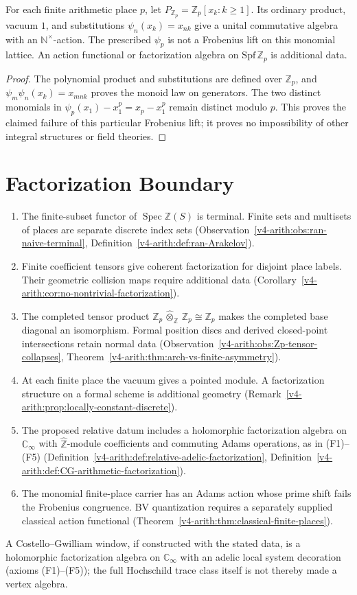 \begin{theorem}
\label{v4-arith:thm:classical-finite-places}
For each finite arithmetic place \(p\), let
\(P_{\mathbb Z_p}=\mathbb Z_p[x_k:k\ge1]\). Its ordinary product,
vacuum \(1\), and substitutions \(\psi_n(x_k)=x_{nk}\) give a unital
commutative algebra with an \(\mathbb N^{\times}\)-action.
The prescribed \(\psi_p\) is not a Frobenius lift on this monomial
lattice. An action functional or factorization algebra on
\(\mathrm{Spf}\,\mathbb Z_p\) is additional data.
\end{theorem}
\begin{proof}
The polynomial product and substitutions are defined over
\(\mathbb Z_p\), and \(\psi_m\psi_n(x_k)=x_{mnk}\) proves the monoid
law on generators. The two distinct monomials in
\(\psi_p(x_1)-x_1^p=x_p-x_1^p\) remain distinct modulo \(p\).
This proves the claimed failure of this particular Frobenius lift;
it proves no impossibility of other integral structures or field theories.
\end{proof}

\section{Factorization Boundary}
\label{v4-arith:cg:summary}

\begin{enumerate}
\item The finite-subset functor of
\(\operatorname{Spec}\mathbb Z(S)\) is terminal. Finite sets and
multisets of places are separate discrete index sets
(Observation~\ref{v4-arith:obs:ran-naive-terminal},
Definition~\ref{v4-arith:def:ran-Arakelov}).
\item Finite coefficient tensors give coherent factorization
for disjoint place labels. Their geometric collision maps require
additional data
(Corollary~\ref{v4-arith:cor:no-nontrivial-factorization}).
\item The completed tensor product
\(\mathbb{Z}_{p}\,\widehat{\otimes}_{\mathbb{Z}}\,\mathbb{Z}_{p}\cong\mathbb{Z}_{p}\)
makes the completed base diagonal an isomorphism. Formal position
discs and derived closed-point intersections retain normal data
(Observation~\ref{v4-arith:obs:Zp-tensor-collapses},
Theorem~\ref{v4-arith:thm:arch-vs-finite-asymmetry}).
\item At each finite place the vacuum gives a pointed module.
A factorization structure on a formal scheme is additional geometry
(Remark~\ref{v4-arith:prop:locally-constant-discrete}).
\item The proposed relative datum includes a
holomorphic factorization algebra on \(\mathbb{C}_{\infty}\) with
\(\widehat{\mathbb{Z}}\)-module coefficients and commuting Adams
operations, as in (F1)--(F5)
(Definition~\ref{v4-arith:def:relative-adelic-factorization},
Definition~\ref{v4-arith:def:CG-arithmetic-factorization}).
\item The monomial finite-place carrier has an Adams action whose
prime shift fails the Frobenius congruence. BV quantization requires a
separately supplied classical action functional
(Theorem~\ref{v4-arith:thm:classical-finite-places}).
\end{enumerate}

A Costello--Gwilliam window, if constructed with the stated data, is a
holomorphic factorization algebra on \(\mathbb{C}_{\infty}\) with an
adelic local system decoration (axioms (F1)--(F5)); the full Hochschild
trace class itself is not thereby made a vertex algebra.
